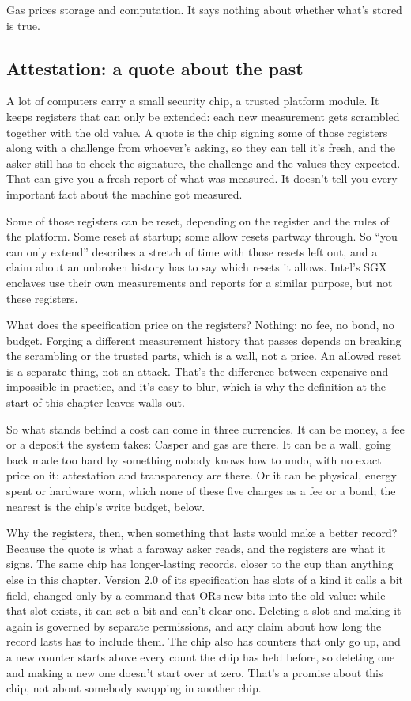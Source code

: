\documentclass[11pt,twoside]{article}
\theoremstyle{thielethm}
\theoremstyle{thieledef}
\theoremstyle{thieledef}
\theoremstyle{thieledef}
\theoremstyle{thielethm}
\theoremstyle{thieleobs}
\theoremstyle{thielethm}
\begin{document}
Gas prices storage and computation. It says nothing about whether what's stored is true.

\subsection{Attestation: a quote about the past}

A lot of computers carry a small security chip, a trusted platform module. It keeps registers that can only be extended: each new measurement gets scrambled together with the old value. A quote is the chip signing some of those registers along with a challenge from whoever's asking, so they can tell it's fresh, and the asker still has to check the signature, the challenge and the values they expected. That can give you a fresh report of what was measured. It doesn't tell you every important fact about the machine got measured.

Some of those registers can be reset, depending on the register and the rules of the platform. Some reset at startup; some allow resets partway through. So ``you can only extend'' describes a stretch of time with those resets left out, and a claim about an unbroken history has to say which resets it allows. Intel's SGX enclaves use their own measurements and reports for a similar purpose, but not these registers.

What does the specification price on the registers? Nothing: no fee, no bond, no budget. Forging a different measurement history that passes depends on breaking the scrambling or the trusted parts, which is a wall, not a price. An allowed reset is a separate thing, not an attack. That's the difference between expensive and impossible in practice, and it's easy to blur, which is why the definition at the start of this chapter leaves walls out.

So what stands behind a cost can come in three currencies. It can be money, a fee or a deposit the system takes: Casper and gas are there. It can be a wall, going back made too hard by something nobody knows how to undo, with no exact price on it: attestation and transparency are there. Or it can be physical, energy spent or hardware worn, which none of these five charges as a fee or a bond; the nearest is the chip's write budget, below.

Why the registers, then, when something that lasts would make a better record? Because the quote is what a faraway asker reads, and the registers are what it signs. The same chip has longer-lasting records, closer to the cup than anything else in this chapter. Version 2.0 of its specification has slots of a kind it calls a bit field, changed only by a command that ORs new bits into the old value: while that slot exists, it can set a bit and can't clear one. Deleting a slot and making it again is governed by separate permissions, and any claim about how long the record lasts has to include them. The chip also has counters that only go up, and a new counter starts above every count the chip has held before, so deleting one and making a new one doesn't start over at zero. That's a promise about this chip, not about somebody swapping in another chip.
\end{document}
